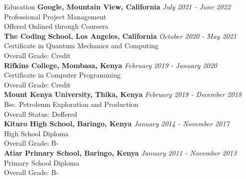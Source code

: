 \documentclass[
	11pt, %
]{resume} %
\begin{document}
\begin{rSection}{Education}
	\textbf{Google, Mountain View, California} \hfill \textit{July 2021 - June 2022} \\ 
	Professional Project Management \\
	Offered Onlined through Coursera \\
	\textbf{The Coding School, Los Angeles, California} \hfill \textit{October 2020 - May 2021} \\ 
	Certificate in Quantum Mechanics and Computing \\
	Overall Grade: Credit \\
	\textbf{Rifkins College, Mombasa, Kenya} \hfill \textit{February 2019 - January 2020} \\ 
	Certificate in Computer Programming \\
	Overall Grade: Credit \\
	\textbf{Mount Kenya University, Thika, Kenya} \hfill \textit{February 2018 - December 2018} \\ 
	Bsc. Petroleum Exploration and Production \\
	Overall Status: Deffered \\
	\textbf{Kituro High School, Baringo, Kenya} \hfill \textit{January 2014 - November 2017} \\ 
	High School Diploma \\
	Overall Grade: B- \\
	\textbf{Atiar Primary School, Baringo, Kenya} \hfill \textit{January 2011 - November 2013} \\ 
	Primary School Diploma \\
	Overall Grade: B-
	
\end{rSection}
\end{document}
